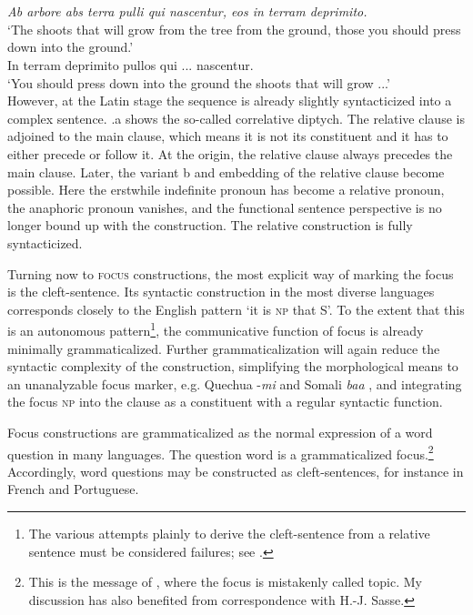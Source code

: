 \ea\label{ex:E96}
 \\
 \ea  {}\\ 
 {\itshape Ab arbore abs terra pulli qui nascentur, eos in terram deprimito.}\\
 \glt ‘The shoots that will grow from the tree from the ground, those you should press down into the ground.’\\
\ex
   In terram deprimito pullos qui ... nascentur.\\
\glt  ‘You should press down into the ground the shoots that will grow ...’\\
\z
\z
\noindent \label{page125b}However, at the Latin stage the sequence is already slightly syntacticized into a complex sentence. .a shows the so-called correlative diptych. The relative clause is adjoined to the main clause, which means it is not its constituent and it has to either precede or follow it. At the origin, the relative clause always precedes the main clause. Later, the variant b and embedding of the relative clause become possible. Here the erstwhile indefinite pronoun has become a relative pronoun, the anaphoric pronoun vanishes, and the functional sentence perspective is no longer bound up with the construction. The relative construction is fully syntacticized.

Turning now to \textsc{focus} constructions, the most explicit way of marking the focus is the cleft-sentence. Its syntactic construction in the most diverse languages corresponds closely to the English pattern ‘it is \textsc{np} that S’. To the extent that this is an autonomous pattern\footnote{The various attempts plainly to derive the cleft-sentence from a relative sentence must be considered failures; see \citealt[Ch.~V.5.3]{Lehmann1984}.}, the communicative function of focus is already minimally grammaticalized. Further grammaticalization will again reduce the syntactic complexity of the construction, simplifying the morphological means to an unanalyzable focus marker, e.g. Quechua -\textit{mi} \citep[35f]{Cole1982} and Somali \textit{baa} \citep[348f]{Sasse1977b}, and integrating the focus \textsc{np} into the clause as a constituent with a regular syntactic function.

Focus constructions are grammaticalized as the normal expression of a word question in many languages. The question word is a grammaticalized focus.\footnote{\label{page125}This is the message of \citealt{Sasse1977b}, where the focus is mistakenly called topic. My discussion has also benefited from correspondence with H.-J. Sasse.} Accordingly, word questions may be constructed as cleft-sentences, for instance in French and Portuguese.

